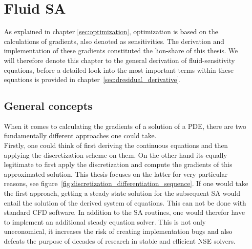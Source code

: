 \documentclass[../main.tex]{subfiles}
\begin{document}
\chapter{Fluid \acf{SA}}\label{sec:SA}
\minitoc

As explained in chapter \ref{sec:optimization}, optimization is based on the calculations of gradients, also denoted as sensitivities.
The derivation and implementation of these gradients constituted the lion-share of this thesis. We will therefore denote this chapter to the general derivation of fluid-sensitivity equations, before a detailed look into the most important terms within these equations is provided in chapter~\ref{sec:dresidual_derivative}.

\section{General concepts}
When it comes to calculating the gradients of a solution of a \ac{PDE}, there are two fundamentally different approaches one could take.\\
Firstly, one could think of first deriving the continuous equations and then applying the discretization scheme on them. On the other hand its equally legitimate to first apply the discretization and compute the gradients of this approximated solution. This thesis focuses on the latter for very particular reasons, see figure~\ref{fig:discretization_differentiation_sequence}.
If one would take the first approach, getting a steady state solution for the subsequent \acf{SA} would entail the solution of the derived system of equations. This can not be done with standard CFD software. In addition to the \ac{SA} routines, one would therefor have to implement an additional steady equation solver. This is not only uneconomical, it increases the risk of creating implementation bugs and also defeats the purpose of decades of research in stable and efficient \ac{NSE} solvers.
\end{document}
